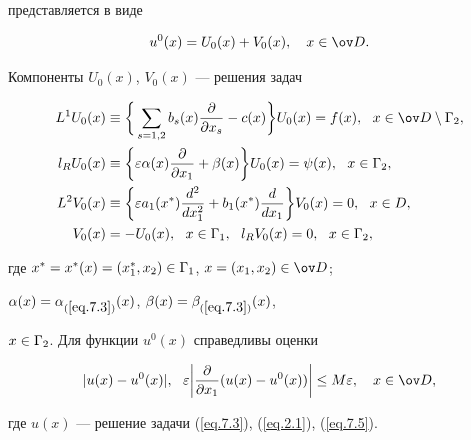 \begin{notes}
представляется в виде


$$


u^0(x)=U_0(x)+V_0(x), \quad x\in\od.


$$


Компоненты $U_0(x)$, $V_0(x)$ --- решения задач


\begin{equation} \label{eq.7.51}


\begin{split}


L^1 U_0(x) &\eq \bigg\{ \sum_{s=1,2}b_s(x)\frac{\pa}{\pa x_s}-


c(x)\bigg\}U_0(x)=f(x), \ \ x \in \od \setminus \G_2, \\


%


l_R U_0(x)&\eq \bigg\{ \eps \al(x) \frac{\pa}{\pa x_1}


+\beta(x)\bigg\} U_0(x)=\psi(x), \ \ x\in \G_2, \\


%


L^2 V_0(x) &\eq \bigg\{ \eps a_1(x^*) \frac{d^2}{dx^2_1}+b_1(x^*)


\frac{d}{dx_1} \bigg\} V_0(x)=0, \ \ x\in D, \\


V_0(x) &= - U_0(x), \ \ x\in \G_1,\ \


l_R V_0(x)=0, \ \ x\in \G_2,


\end{split}


\end{equation}


где $x^*=x^*(x)=(x_1^*,x_2) \in \Gamma_1$, $x=(x_1,x_2) \in \od$; 


$\alpha(x)=\alpha_{(\ref{eq.7.3})}(x)$, $\beta(x)=\beta_{(\ref{eq.7.3})}(x)$,


$x\in\Gamma_2$. Для функции $u^0(x)$ справедливы оценки


\begin{equation} \label{eq.7.6}


|u(x)-u^0(x)|, \ \ \eps 


\bigg|\frac{\pad}{\pad x_1}(u(x)-u^0(x))\bigg|\leq M\eps, \quad x\in \od,


\end{equation}


где $u(x)$ --- решение задачи (\ref{eq.7.3}), (\ref{eq.2.1}), (\ref{eq.7.5}).


\end{notes}









